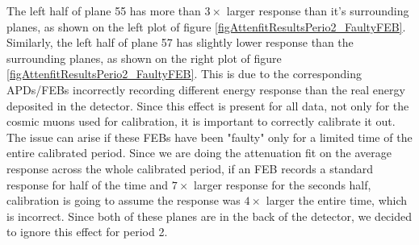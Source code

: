 \documentclass[12pt,a4paper]{article}
\begin{document}
The left half of plane 55 has more than $3\times$ larger response than it's surrounding planes, as shown on the left plot of figure \ref{figAttenfitResultsPerio2_FaultyFEB}. Similarly, the left half of plane 57 has slightly lower response than the surrounding planes, as shown on the right plot of figure \ref{figAttenfitResultsPerio2_FaultyFEB}. This is due to the corresponding APDs/FEBs incorrectly recording different energy response than the real energy deposited in the detector. Since this effect is present for all data, not only for the cosmic muons used for calibration, it is important to correctly calibrate it out. The issue can arise if these FEBs have been "faulty" only for a limited time of the entire calibrated period. Since we are doing the attenuation fit on the average response across the whole calibrated period, if an FEB records a standard response for half of the time and $7\times$ larger response for the seconds half, calibration is going to assume the response was $4\times$ larger the entire time, which is incorrect. Since both of these planes are in the back of the detector, we decided to ignore this effect for period 2.
\end{document}
